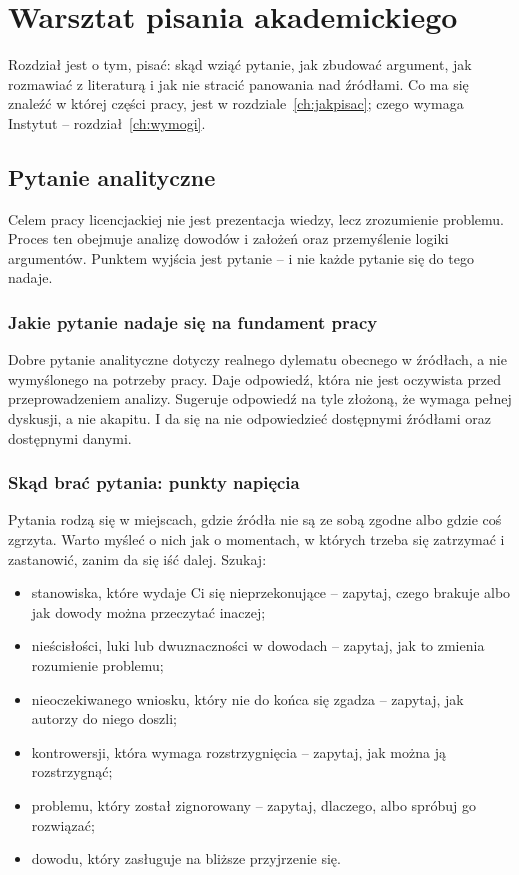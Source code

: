 \chapter{Warsztat pisania akademickiego}\label{ch:warsztat}

Rozdział jest o tym,  pisać: skąd wziąć pytanie, jak zbudować argument, jak rozmawiać z literaturą i jak nie stracić panowania nad źródłami. Co ma się znaleźć w której części pracy, jest w rozdziale~\ref{ch:jakpisac}; czego wymaga Instytut -- rozdział~\ref{ch:wymogi}.

\section{Pytanie analityczne}\label{sec:pytanie}

Celem pracy licencjackiej nie jest prezentacja wiedzy, lecz zrozumienie problemu. Proces ten obejmuje analizę dowodów i założeń oraz przemyślenie logiki argumentów. Punktem wyjścia jest pytanie -- i nie każde pytanie się do tego nadaje.

\subsection{Jakie pytanie nadaje się na fundament pracy}

Dobre pytanie analityczne dotyczy realnego dylematu obecnego w źródłach, a nie wymyślonego na potrzeby pracy. Daje odpowiedź, która nie jest oczywista przed przeprowadzeniem analizy. Sugeruje odpowiedź na tyle złożoną, że wymaga pełnej dyskusji, a nie akapitu. I da się na nie odpowiedzieć dostępnymi źródłami oraz dostępnymi danymi.

\subsection{Skąd brać pytania: punkty napięcia}

Pytania rodzą się w miejscach, gdzie źródła nie są ze sobą zgodne albo gdzie coś zgrzyta. Warto myśleć o nich jak o momentach, w których trzeba się zatrzymać i zastanowić, zanim da się iść dalej. Szukaj:

\begin{itemize}
\item stanowiska, które wydaje Ci się nieprzekonujące -- zapytaj, czego brakuje albo jak dowody można przeczytać inaczej;
\item nieścisłości, luki lub dwuznaczności w dowodach -- zapytaj, jak to zmienia rozumienie problemu;
\item nieoczekiwanego wniosku, który nie do końca się zgadza -- zapytaj, jak autorzy do niego doszli;
\item kontrowersji, która wymaga rozstrzygnięcia -- zapytaj, jak można ją rozstrzygnąć;
\item problemu, który został zignorowany -- zapytaj, dlaczego, albo spróbuj go rozwiązać;
\item dowodu, który zasługuje na bliższe przyjrzenie się.
\end{itemize}

